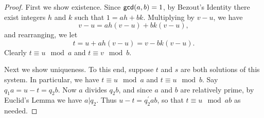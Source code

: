 \begin{proof}
First we show existence. Since \(\mathsf{gcd}(a, b) = 1\), by Bezout's Identity there exist integers \(h\) and \(k\) such that \(1 = ah + bk\). Multiplying by \(v-u\), we have \[ v-u = ah(v-u) + bk(v-u), \] and rearranging, we let \[ t = u + ah(v-u) = v - bk(v-u). \] Clearly \(t \equiv u \mod a\) and \(t \equiv v \mod b\).

Next we show uniqueness. To this end, suppose \(t\) and \(s\) are both solutions of this system. In particular, we have \(t \equiv u \mod a\) and \(t \equiv u \mod b\). Say \(q_1a = u - t = q_2b\). Now \(a\) divides \(q_2b\), and since \(a\) and \(b\) are relatively prime, by Euclid's Lemma we have \(a|q_2\). Thus \(u-t = q_2^\prime ab\), so that \(t \equiv u \mod ab\) as needed.
\end{proof}


